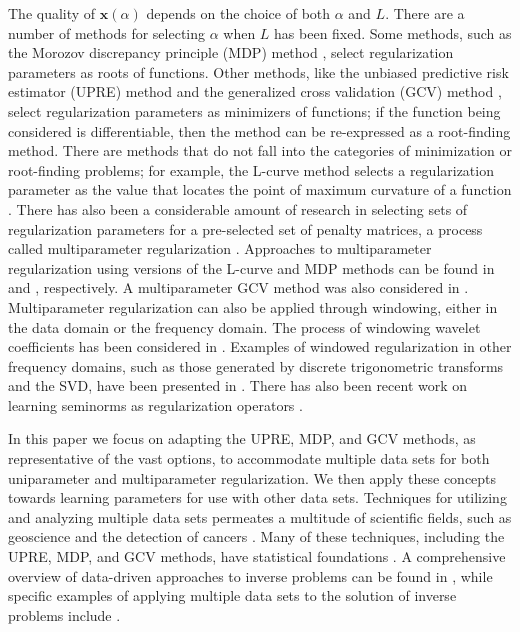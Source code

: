 \documentclass[12pt]{article}
\newcommand{\xVec}{\mathbf{x}}	%
\newcommand{\regparam}{\alpha}  %
\newcommand{\xReg}{\xVec(\regparam)}	%
\begin{document}
The quality of $\xReg$ depends on the choice of both $\regparam$ and $L$. There are a number of methods for selecting $\regparam$ when $L$ has been fixed. Some methods, such as the Morozov discrepancy principle (MDP) method \cite{Morozov1966}, select regularization parameters as roots of functions. Other methods, like the unbiased predictive risk estimator (UPRE) method \cite{Mallows1973} and the generalized cross validation (GCV) method \cite{Wahba1977,Wahba1990}, select regularization parameters as minimizers of functions; if the function being considered is differentiable, then the method can be re-expressed as a root-finding method. There are methods that do not fall into the categories of minimization or root-finding problems; for example, the L-curve method selects a regularization parameter as the value that locates the point of maximum curvature of a function \cite{Hansen1992,HansenOLeary}. There has also been a considerable amount of research in selecting sets of regularization parameters for a pre-selected set of penalty matrices, a process called multiparameter regularization \cite{Brezinski2003,ChungEspanol2017,GazzolaNovati2013,LuPereverzev2011,Wood2002}. Approaches to multiparameter regularization using versions of the L-curve and MDP methods can be found in \cite{BelgeKilmerMiller2002} and \cite{Wang2012}, respectively. A multiparameter GCV method was also considered in \cite{ModarresiGolub1,ModarresiGolub2}. Multiparameter regularization can also be applied through windowing, either in the data domain or the frequency domain. The process of windowing wavelet coefficients has been considered in \cite{EasleyLabatePatel,StephanakisKollias}. Examples of windowed regularization in other frequency domains, such as those generated by discrete trigonometric transforms and the SVD, have been presented in \cite{ChungEasleyOLeary,ChungKilmerOLeary,KalkeSiltanen}. There has also been recent work on learning seminorms as regularization operators \cite{Holler2020LearningNR}. \par 
In this paper we focus on adapting the UPRE, MDP, and GCV methods, as representative of the vast options, to accommodate multiple data sets for both uniparameter and multiparameter regularization. We then apply these concepts towards learning parameters for use with other data sets. Techniques for utilizing and analyzing multiple data sets permeates a multitude of scientific fields, such as geoscience \cite{GeoscienceML,Zobitz2020EfficientHD} and the detection of cancers \cite{MedicineML}. Many of these techniques, including the UPRE, MDP, and GCV methods, have statistical foundations \cite{StatLearning}. A comprehensive overview of data-driven approaches to inverse problems can be found in \cite{Arridge2019SolvingIP}, while specific examples of applying multiple data sets to the solution of inverse problems include \cite{ChungChungOLeary2011,ChungEspanol2017,HaberTenorio2003,KunischPock2013,TaroudakiOLeary2015,Learning2005}. \par 
\end{document}
